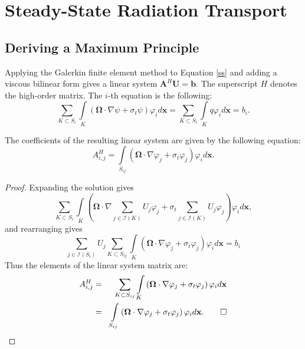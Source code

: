 \section{Steady-State Radiation Transport}
\subsection{Deriving a Maximum Principle}
Applying the Galerkin finite element method to Equation \ref{ss} and adding a
viscous bilinear form gives a linear system $\mathbf{A}^H \mathbf{U} = \mathbf{b}$.
The superscript $H$ denotes the high-order matrix. 
The $i$-th equation is the following:
\begin{equation}
	\sum\limits_{K\subset S_i}\int\limits_K\left(\mathbf{\Omega}\cdot\nabla\psi
      + \sigma_t\psi\right)\varphi_i d\mathbf{x}
      = \sum\limits_{K\subset S_i}\int\limits_K q \varphi_i d\mathbf{x} = b_i.
\end{equation}

\begin{lemma}
The coefficients of the resulting linear system are given by the following equation:
\begin{equation}\label{Aij}
	A^H_{i,j} = \int\limits_{S_{ij}}\left(\mathbf{\Omega}\cdot\nabla\varphi_j +
		\sigma_t\varphi_j\right)\varphi_i d\mathbf{x}.
\end{equation}
\end{lemma}

\begin{proof}
Expanding the solution gives
\[
	\sum\limits_{K\subset S_i}\int\limits_K\left(\mathbf{\Omega}\cdot
      \nabla\sum\limits_{j\in \mathcal{I}(K)}U_j\varphi_j +
		\sigma_t\sum\limits_{j\in \mathcal{I}(K)}U_j\varphi_j\right)\varphi_i d\mathbf{x},
\]
and rearranging gives
\[
	\sum\limits_{j\in \mathcal{I}(S_{i})}U_j\sum\limits_{K\subset S_{ij}}
      \int\limits_K\left(\mathbf{\Omega}\cdot\nabla\varphi_j +
		\sigma_t\varphi_j\right)\varphi_i d\mathbf{x} = b_i
\]
Thus the elements of the linear system matrix are:
\begin{eqnarray*}
	A^H_{i,j} & = & \sum\limits_{K\subset S_{ij}}\int\limits_K
      \left(\mathbf{\Omega}\cdot\nabla\varphi_j +
		\sigma_t\varphi_j\right)\varphi_i d\mathbf{x}\\
  & = & \int\limits_{S_{ij}}\left(\mathbf{\Omega}\cdot\nabla\varphi_j +
		\sigma_t\varphi_j\right)\varphi_i d\mathbf{x}.\qed
\end{eqnarray*}
\end{proof}

